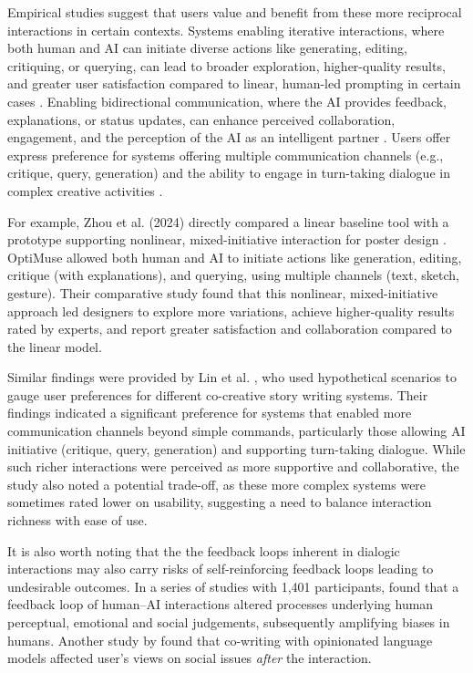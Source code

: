Empirical studies suggest that users value and benefit from these more reciprocal interactions in certain contexts. Systems enabling iterative interactions, where both human and AI can initiate diverse actions like generating, editing, critiquing, or querying, can lead to broader exploration, higher-quality results, and greater user satisfaction compared to linear, human-led prompting in certain cases \cite{Zhou2024-vp, Lin2023-jd}. Enabling bidirectional communication, where the AI provides feedback, explanations, or status updates, can enhance perceived collaboration, engagement, and the perception of the AI as an intelligent partner \cite{Rezwana2023-gj, Rezwana2022-ui}. Users offer express preference for systems offering multiple communication channels (e.g., critique, query, generation) and the ability to engage in turn-taking dialogue in complex creative activities \cite{Lin2023-jd}.

For example, Zhou et al. (2024) directly compared a linear baseline tool with a prototype supporting nonlinear, mixed-initiative interaction for poster design \cite{Zhou2024-vp}. OptiMuse allowed both human and AI to initiate actions like generation, editing, critique (with explanations), and querying, using multiple channels (text, sketch, gesture). Their comparative study found that this nonlinear, mixed-initiative approach led designers to explore more variations, achieve higher-quality results rated by experts, and report greater satisfaction and collaboration compared to the linear model.

Similar findings were provided by Lin et al. \cite{Lin2023-jd}, who used hypothetical scenarios to gauge user preferences for different co-creative story writing systems. Their findings indicated a significant preference for systems that enabled more communication channels beyond simple commands, particularly those allowing AI initiative (critique, query, generation) and supporting turn-taking dialogue. While such richer interactions were perceived as more supportive and collaborative, the study also noted a potential trade-off, as these more complex systems were sometimes rated lower on usability, suggesting a need to balance interaction richness with ease of use.

It is also worth noting that the the feedback loops inherent in dialogic interactions may also carry risks of self-reinforcing feedback loops leading to undesirable outcomes. In a series of studies with 1,401 participants, \cite{Glickman2024-zh} found that a feedback loop of human–AI interactions altered processes underlying human perceptual, emotional and social judgements, subsequently amplifying biases in humans. Another study by \cite{Jakesch2023-ks} found that co-writing with opinionated language models affected user's views on social issues \textit{after} the interaction. 

